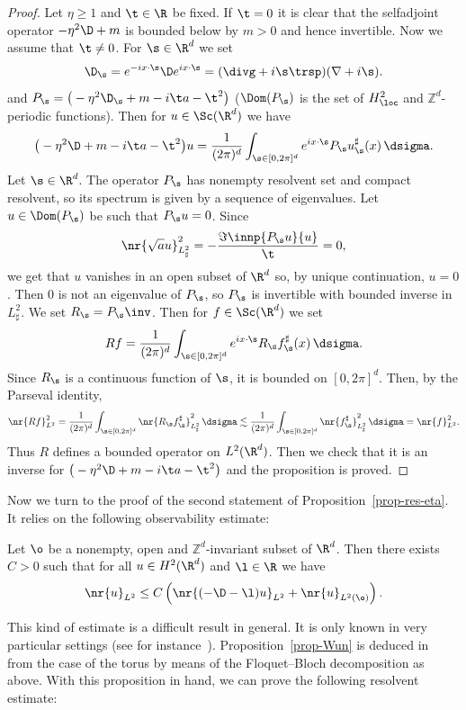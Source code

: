 \begin{proof}
Let $\eta \geq 1$ and $\t \in \R$ be fixed. If $\t = 0$ it is clear that the selfadjoint operator $-\eta^2 \D + m$ is bounded below by $m > 0$ and hence invertible. Now we assume that $\t \neq 0$. For $\s \in \R^d$ we set
\[
\D_\s = e^{-ix\cdot \s} \D e^{ix\cdot \s} = (\divg + i \s\trsp) (\nabla + i\s).
\]
and $P_\s = \big(-\eta^2 \D_\s + m - i\t a - \t^2 \big)$ ($\Dom(P_\s)$ is the set of $H^2_\loc$ and $\mathbb Z^d$-periodic functions). Then for $u \in \Sc(\R^d)$ we have
\[
\big(-\eta^2 \D + m - i\t a - \t^2 \big) u = \frac 1 {(2\pi)^d} \int_{\s \in [0,2\pi]^d} e^{ix\cdot \s} P_\s u^\sharp_\s(x) \, \dsigma.
\]
Let $\s \in \R^d$. The operator $P_\s$ has nonempty resolvent set and compact resolvent, so its spectrum is given by a sequence of eigenvalues. Let $u \in \Dom(P_\s)$ be such that $P_\s u = 0$. Since
\[
\nr{\sqrt a u}_{L^2_\sharp}^2 = - \frac {\Im \innp{P_\s u}{u}} \t = 0,
\]
we get that $u$ vanishes in an open subset of $\R^d$ so, by unique continuation, $u = 0$. Then 0 is not an eigenvalue of $P_\s$, so $P_\s$ is invertible with bounded inverse in $L^2_\sharp$. We set $R_\s = P_\s\inv$. Then for $f \in \Sc(\R^d)$ we set
\[
R f = \frac 1 {(2\pi)^d} \int_{\s \in [0,2\pi]^d} e^{ix\cdot \s} R_\s f^\sharp_\s(x) \, \dsigma.
\]
Since $R_\s$ is a continuous function of $\s$, it is bounded on $[0,2\pi]^d$. Then, by the Parseval identity,
\[
\nr{Rf}_{L^2}^2 = \frac 1 {(2\pi)^d} \int_{\s \in [0,2\pi]^d} \nr{R_\s f_\s^\sharp}_{L^2_\sharp}^2 \, \dsigma \lesssim \frac 1 {(2\pi)^d} \int_{\s \in [0,2\pi]^d} \nr{ f_\s^\sharp}_{L^2_\sharp}^2 \, \dsigma = \nr{f}_{L^2}^2.
\]
Thus $R$ defines a bounded operator on $L^2(\R^d)$. Then we check that it is an inverse for $\big(-\eta^2 \D + m - i\t a - \t^2 \big)$ and the proposition is proved.
\end{proof}

Now we turn to the proof of the second statement of Proposition~\ref{prop-res-eta}. It relies on the following observability estimate:

\begin{prop}\label{prop-Wun}
Let $\o$ be a nonempty, open and $\mathbb Z^d$-invariant subset of $\R^d$. Then there exists $C > 0$ such that for all $u \in H^2(\R^d)$ and $\l \in \R$ we have
\[
\nr{u}_{L^2} \leq C \left(\nr{(-\D - \l)u}_{L^2} + \nr{u}_{L^2(\o)} \right).
\]
\end{prop}

This kind of estimate is a difficult result in general. It is only known in very particular settings (see for instance~\cite{Jaffard90,BurqZwo12,AnantharamanLeMa16}). Proposition~\ref{prop-Wun} is deduced in~\cite{Wunsch} from the case of the torus by means of the Floquet--Bloch decomposition as above. With this proposition in hand, we can prove the following resolvent estimate:

